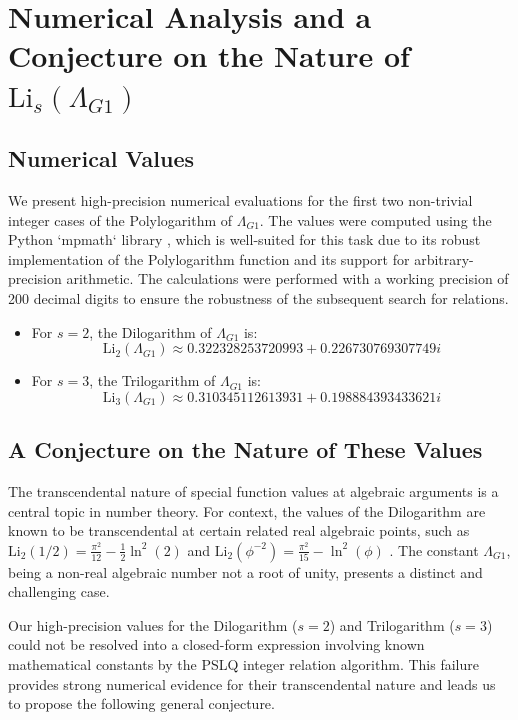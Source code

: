 \documentclass{amsart}
\theoremstyle{plain}
\theoremstyle{definition}
\theoremstyle{remark}
\newcommand{\LambdaG}{\Lambda_{G1}}
\begin{document}
\section{Numerical Analysis and a Conjecture on the Nature of \texorpdfstring{$\mathrm{Li}_s(\LambdaG)$}{Li\_s(Lambda\_G1)}}

\subsection{Numerical Values}
We present high-precision numerical evaluations for the first two non-trivial integer cases of the Polylogarithm of $\LambdaG$. The values were computed using the Python `mpmath` library \cite{mpmath}, which is well-suited for this task due to its robust implementation of the Polylogarithm function and its support for arbitrary-precision arithmetic. The calculations were performed with a working precision of 200 decimal digits to ensure the robustness of the subsequent search for relations.
\begin{itemize}
    \item For $s=2$, the Dilogarithm of $\LambdaG$ is:
    $$ \mathrm{Li}_2(\LambdaG) \approx 0.322328253720993 + 0.226730769307749i $$
    \item For $s=3$, the Trilogarithm of $\LambdaG$ is:
    $$ \mathrm{Li}_3(\LambdaG) \approx 0.310345112613931 + 0.198884393433621i $$
\end{itemize}

\subsection{A Conjecture on the Nature of These Values}
The transcendental nature of special function values at algebraic arguments is a central topic in number theory. For context, the values of the Dilogarithm are known to be transcendental at certain related real algebraic points, such as $\mathrm{Li}_2(1/2) = \frac{\pi^2}{12} - \frac{1}{2}\ln^2(2)$ and $\mathrm{Li}_2(\phi^{-2}) = \frac{\pi^2}{15} - \ln^2(\phi)$ \cite{Lewin}. The constant $\LambdaG$, being a non-real algebraic number not a root of unity, presents a distinct and challenging case.

Our high-precision values for the Dilogarithm ($s=2$) and Trilogarithm ($s=3$) could not be resolved into a closed-form expression involving known mathematical constants by the PSLQ integer relation algorithm. This failure provides strong numerical evidence for their transcendental nature and leads us to propose the following general conjecture.
\end{document}
